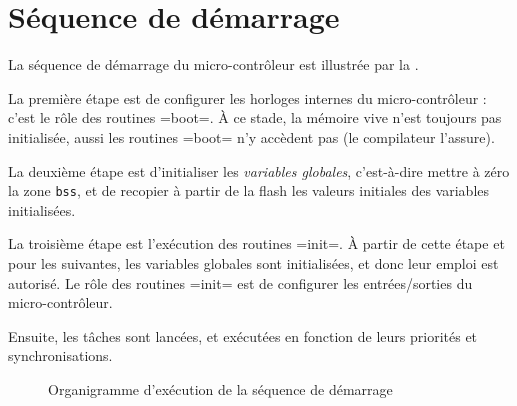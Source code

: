 


\section{Séquence de démarrage}

La séquence de démarrage du micro-contrôleur est illustrée par la .

La première étape est de configurer les horloges internes du micro-contrôleur : c'est le rôle des routines \plm=boot=. À ce stade, la mémoire vive n'est toujours pas initialisée, aussi les routines \plm=boot= n'y accèdent pas (le compilateur l'assure).

La deuxième étape est d'initialiser les \emph{variables globales}, c'est-à-dire mettre à zéro la zone \texttt{bss}, et de recopier à partir de la flash les valeurs initiales des variables initialisées.

La troisième étape est l'exécution des routines \plm=init=. À partir de cette étape et pour les suivantes, les variables globales sont initialisées, et donc leur emploi est autorisé. Le rôle des routines \plm=init= est de configurer les entrées/sorties du micro-contrôleur.

Ensuite, les tâches sont lancées, et exécutées en fonction de leurs priorités et synchronisations.

\begin{figure}[t]
  \centering
  \small
  \caption{Organigramme d'exécution de la séquence de démarrage}
  \ligne
\end{figure}


